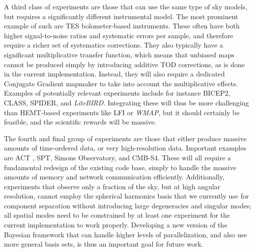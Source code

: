 \documentclass[twocolumn]{aa}
\def\WMAP{\emph{WMAP}}
\begin{document}
A third class of experiments are those that can use the same type of
sky models, but requires a significantly different instrumental
model. The most prominent example of such are TES bolometer-based
instruments. These often have both higher signal-to-noise ratios and
systematic errors per sample, and therefore require a richer set of
systematics corrections. They also typically have a significant
multiplicative transfer function, which means that unbiased maps
cannot be produced simply by introducing additive TOD corrections, as
is done in the current implementation.  Instead, they will also require
a dedicated Conjugate Gradient mapmaker to take into account the
multiplicative effects. Examples of potentially relevant experiments
include for instance BICEP2, CLASS, SPIDER, and \emph{LiteBIRD}. Integrating
these will thus be more challenging than HEMT-based experiments like
LFI or \WMAP, but it should certainly be feasible, and the scientific
rewards will be massive.

The fourth and final group of experiments are those that either
produce massive amounts of time-ordered data, or very high-resolution
data. Important examples are ACT , SPT, Simons Observatory, and CMB-S4. 
These will all require a fundamental redesign of the existing
code base, simply to handle the massive amounts of
memory and network communication efficiently. Additionally,
experiments that observe only a fraction of the sky, but at high
angular resolution, cannot employ the spherical harmonics basis that
we currently use for component separation without introducing large
degeneracies and singular modes; all spatial modes need to be
constrained by at least one experiment for the current implementation
to work properly. Developing a new version of the Bayesian framework
that can handle higher levels of parallelization, and also use more
general basis sets, is thus an important goal for future work.
\end{document}
